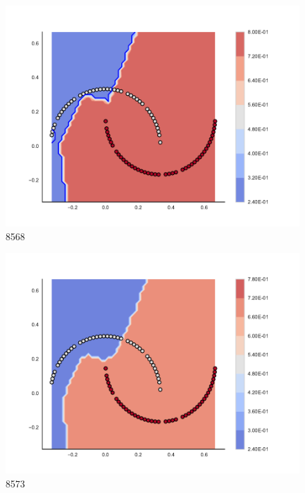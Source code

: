 \begin{subfigure}[b]{0.09\textwidth}
    \includegraphics[clip, trim=2.35cm 1.75cm 4.5cm 0cm,width=\textwidth]{img/convergence/8568.pdf}
    \caption{8568}
    \label{fig:convergence_8568}
\end{subfigure}
%
\begin{subfigure}[b]{0.09\textwidth}
    \includegraphics[clip, trim=2.35cm 1.75cm 4.5cm 0cm,width=\textwidth]{img/convergence/8573.pdf}
    \caption{8573}
    \label{fig:convergence_8573}
\end{subfigure}
%
